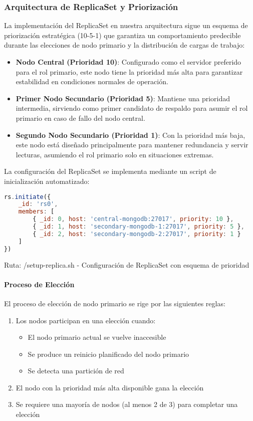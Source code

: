 \documentclass[12pt,letterpaper]{article}
\begin{document}
\subsubsection{Arquitectura de ReplicaSet y Priorización}
La implementación del ReplicaSet en nuestra arquitectura sigue un esquema de priorización estratégica (10-5-1) que garantiza un comportamiento predecible durante las elecciones de nodo primario y la distribución de cargas de trabajo:

\begin{itemize}
    \item \textbf{Nodo Central (Prioridad 10)}: Configurado como el servidor preferido para el rol primario, este nodo tiene la prioridad más alta para garantizar estabilidad en condiciones normales de operación.
    \item \textbf{Primer Nodo Secundario (Prioridad 5)}: Mantiene una prioridad intermedia, sirviendo como primer candidato de respaldo para asumir el rol primario en caso de fallo del nodo central.
    \item \textbf{Segundo Nodo Secundario (Prioridad 1)}: Con la prioridad más baja, este nodo está diseñado principalmente para mantener redundancia y servir lecturas, asumiendo el rol primario solo en situaciones extremas.
\end{itemize}

La configuración del ReplicaSet se implementa mediante un script de inicialización automatizado:

\begin{lstlisting}[language=javascript]
rs.initiate({
    _id: 'rs0',
    members: [
        { _id: 0, host: 'central-mongodb:27017', priority: 10 },
        { _id: 1, host: 'secondary-mongodb-1:27017', priority: 5 },
        { _id: 2, host: 'secondary-mongodb-2:27017', priority: 1 }
    ]
})
\end{lstlisting}
\small{Ruta: /setup-replica.sh - Configuración de ReplicaSet con esquema de prioridad}

\paragraph{Proceso de Elección}
El proceso de elección de nodo primario se rige por las siguientes reglas:

\begin{enumerate}
    \item Los nodos participan en una elección cuando:
        \begin{itemize}
            \item El nodo primario actual se vuelve inaccesible
            \item Se produce un reinicio planificado del nodo primario
            \item Se detecta una partición de red
        \end{itemize}
    \item El nodo con la prioridad más alta disponible gana la elección
    \item Se requiere una mayoría de nodos (al menos 2 de 3) para completar una elección
\end{enumerate}
\end{document}
